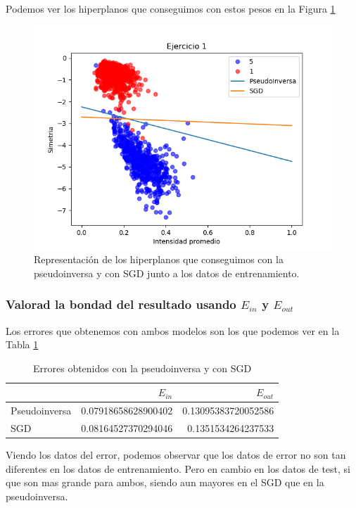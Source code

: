 \documentclass[12pt,a4paper]{article}
\begin{document}
Podemos ver los hiperplanos que conseguimos con estos pesos en la Figura \ref{pic:hiperplanos}
\begin{figure}[H]  %
	\centering
	\includegraphics{images/hiperplanosEjercicio1.png}  %
	\caption{Representación de los hiperplanos que conseguimos con la pseudoinversa y con SGD junto a los datos de entrenamiento.}
	\label{pic:hiperplanos}
\end{figure}
\subsubsection{Valorad la bondad del resultado usando $E_{in}$ y $E_{out}$}

Los errores que obtenemos con ambos modelos son los que podemos ver en la Tabla \ref{tab:errores}
	
\begin{table}[H]
	\centering
	\caption {Errores obtenidos con la pseudoinversa y con SGD} \label{tab:errores} 
	
	\begin{tabular}{|l|r|r|}
		\hline
		\backslashbox{Método}{Error} & $E_{in}$ & $E_{out}$\\ 
		\hline
		Pseudoinversa & 0.07918658628900402 & 0.13095383720052586 \\
		\hline
		SGD & 0.08164527370294046 & 0.1351534264237533 \\
		\hline
	\end{tabular}
\end{table}
Viendo los datos del error, podemos observar que los datos de error no son tan diferentes en los datos de entrenamiento. Pero en cambio en los datos de test, si que son mas grande para ambos, siendo aun mayores en el SGD que en la pseudoinversa.
\end{document}
